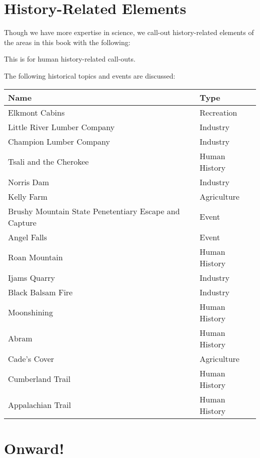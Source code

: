 \documentclass[
]{book}
\begin{document}
\hypertarget{history-related-elements}{%
\section*{History-Related Elements}\label{history-related-elements}}

Though we have more expertise in science, we call-out history-related elements of the areas in this book with the following:

\begin{rmdhistory}
This is for human history-related call-outs.
\end{rmdhistory}

The following historical topics and events are discussed:

\begin{table}
\centering
\begin{tabular}[t]{l|l}
\hline
Name & Type\\
\hline
Elkmont Cabins & Recreation\\
\hline
Little River Lumber Company & Industry\\
\hline
Champion Lumber Company & Industry\\
\hline
Tsali and the Cherokee & Human History\\
\hline
Norris Dam & Industry\\
\hline
Kelly Farm & Agriculture\\
\hline
Brushy Mountain State Penetentiary Escape and Capture & Event\\
\hline
Angel Falls & Event\\
\hline
Roan Mountain & Human History\\
\hline
Ijams Quarry & Industry\\
\hline
Black Balsam Fire & Industry\\
\hline
Moonshining & Human History\\
\hline
Abram & Human History\\
\hline
Cade's Cover & Agriculture\\
\hline
Cumberland Trail & Human History\\
\hline
Appalachian Trail & Human History\\
\hline
\end{tabular}
\end{table}

\hypertarget{onward}{%
\section*{Onward!}\label{onward}}
\end{document}
